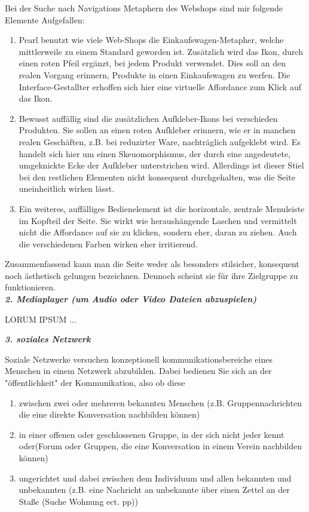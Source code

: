 \documentclass[a4paper,10pt]{article}
\begin{document}
Bei der Suche nach Navigations Metaphern des Webshops sind mir folgende Elemente Aufgefallen:\newline
\begin{enumerate}
\item Pearl benutzt wie viele Web-Shops die Einkaufswagen-Metapher, welche mittlerweile zu einem Standard geworden ist. Zusätzlich wird das Ikon, durch einen roten Pfeil ergänzt, bei jedem Produkt verwendet. Dies soll an den realen Vorgang erinnern, Produkte in einen Einkaufswagen zu werfen. Die Interface-Gestallter erhoffen sich hier eine virtuelle Affordance zum Klick auf das Ikon.
\item Bewusst auffällig sind die zusätzlichen Aufkleber-Ikons bei verschieden Produkten. Sie sollen an einen roten Aufkleber erinnern, wie er in manchen realen Geschäften, z.B. bei reduzirter Ware, nachträglich aufgeklebt wird. Es handelt sich hier um einen Skeuomorphismus, der durch eine angedeutete, umgeknickte Ecke der Aufkleber unterstrichen wird. Allerdings ist dieser Stiel bei den restlichen Elementen nicht konsequent durchgehalten, was die Seite uneinheitlich wirken lässt.
\item Ein weiteres, auffälliges Bedienelement ist die horizontale, zentrale Menuleiste im Kopfteil der Seite. Sie wirkt wie heraushängende Laschen und vermittelt nicht die Affordance auf sie zu klicken, sondern eher, daran zu ziehen. Auch die verschiedenen Farben wirken eher irritierend.
\end{enumerate}

Zusammenfassend kann man die Seite weder als besonders stilsicher, konsequent noch ästhetisch gelungen bezeichnen. Dennoch scheint sie für ihre Zielgruppe zu funktionieren.\\

\textbf{\textit{2. Mediaplayer (um Audio oder Video Dateien abzuspielen)}} \newline

LORUM IPSUM ... \newline

\textbf{\textit{3. soziales Netzwerk}} \newline

Soziale Netzwerke versuchen konzeptionell kommunikationsbereiche eines Menschen in einem Netzwerk abzubilden. Dabei bedienen Sie sich an der "öffentlichkeit" der Kommunikation, also ob diese
\begin{enumerate}
\item zwischen zwei oder mehreren bekannten Menschen (z.B. Gruppennachrichten die eine direkte Konversation nachbilden können)
\item in einer offenen oder geschlossenen Gruppe, in der sich nicht jeder kennt oder(Forum oder Gruppen, die eine Konversation in einem Verein nachbilden können)
\item ungerichtet und dabei zwischen dem Individuum und allen bekannten und unbekannten (z.B. eine Nachricht an unbekannte über einen Zettel an der Staße (Suche Wohnung ect. pp))
\end{enumerate}
\end{document}
